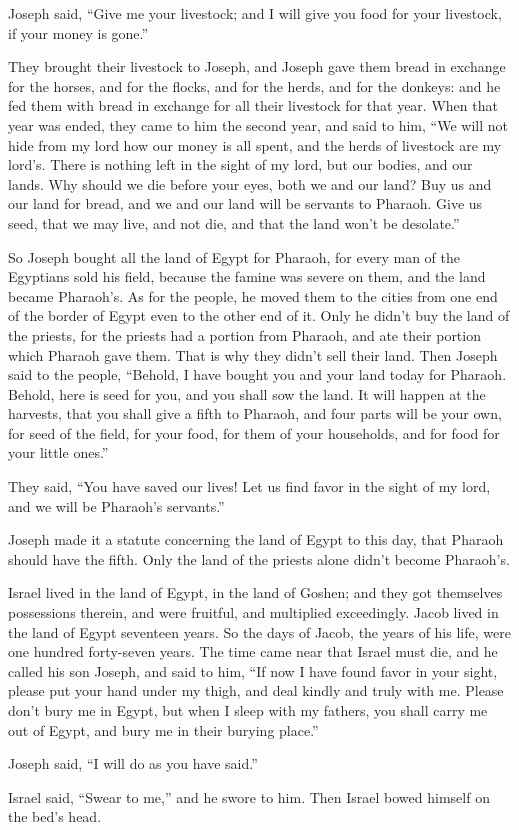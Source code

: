 {\par }{\PP {}Joseph said, “Give me your livestock; and I will give you food for your livestock, if your money is gone.”
\par }{\PP {}They brought their livestock to Joseph, and Joseph gave them bread in exchange for the horses, and for the flocks, and for the herds, and for the donkeys: and he fed them with bread in exchange for all their livestock for that year.
When that year was ended, they came to him the second year, and said to him, “We will not hide from my lord how our money is all spent, and the herds of livestock are my lord’s. There is nothing left in the sight of my lord, but our bodies, and our lands.
Why should we die before your eyes, both we and our land? Buy us and our land for bread, and we and our land will be servants to Pharaoh. Give us seed, that we may live, and not die, and that the land won’t be desolate.”
\par }{\PP {}So Joseph bought all the land of Egypt for Pharaoh, for every man of the Egyptians sold his field, because the famine was severe on them, and the land became Pharaoh’s.
As for the people, he moved them to the cities from one end of the border of Egypt even to the other end of it.
Only he didn’t buy the land of the priests, for the priests had a portion from Pharaoh, and ate their portion which Pharaoh gave them. That is why they didn’t sell their land.
Then Joseph said to the people, “Behold, I have bought you and your land today for Pharaoh. Behold, here is seed for you, and you shall sow the land.
It will happen at the harvests, that you shall give a fifth to Pharaoh, and four parts will be your own, for seed of the field, for your food, for them of your households, and for food for your little ones.”
\par }{\PP {}They said, “You have saved our lives! Let us find favor in the sight of my lord, and we will be Pharaoh’s servants.”
\par }{\PP {}Joseph made it a statute concerning the land of Egypt to this day, that Pharaoh should have the fifth. Only the land of the priests alone didn’t become Pharaoh’s.
\par }{\PP {}Israel lived in the land of Egypt, in the land of Goshen; and they got themselves possessions therein, and were fruitful, and multiplied exceedingly.
Jacob lived in the land of Egypt seventeen years. So the days of Jacob, the years of his life, were one hundred forty-seven years.
The time came near that Israel must die, and he called his son Joseph, and said to him, “If now I have found favor in your sight, please put your hand under my thigh, and deal kindly and truly with me. Please don’t bury me in Egypt,
but when I sleep with my fathers, you shall carry me out of Egypt, and bury me in their burying place.”
\par }{\PP Joseph said, “I will do as you have said.”
\par }{\PP {}Israel said, “Swear to me,” and he swore to him. Then Israel bowed himself on the bed’s head.

}
